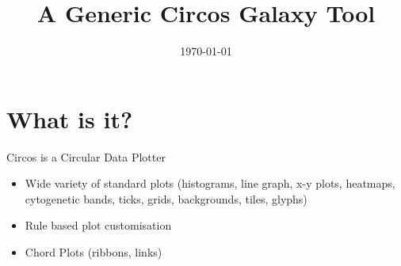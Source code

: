 \documentclass[12pt]{beamer} %
\title[Circos]{A Generic Circos Galaxy Tool}
\author[\myName\\ \color{gray} \myGpgFingerprint]{\myName}
\date[\today]{\today}
\begin{document}
\frame{\titlepage}

\section{What is it?}
\begin{frame}{Circos is a Circular Data Plotter}
    \begin{itemize}
        \item Wide variety of standard plots (histograms, line graph, x-y plots, heatmaps,
            cytogenetic bands, ticks, grids, backgrounds, tiles, glyphs)
        \item Rule based plot customisation
        \item Chord Plots (ribbons, links)
    \end{itemize}
\end{frame}

{
  \begin{frame}[plain]
  \end{frame}
}
\end{document}

